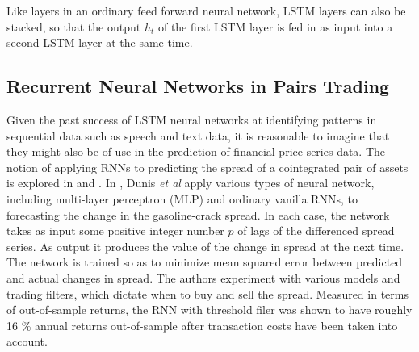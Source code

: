 \documentclass{article}
\begin{document}
Like layers in an ordinary feed forward neural network, LSTM layers can also be stacked, so that the output $h_{t}$ of the first LSTM layer is fed in as input into a second LSTM layer at the same time. 














\subsection{Recurrent Neural Networks in Pairs Trading}

Given the past success of LSTM neural networks at identifying patterns in sequential data such as speech and text data, it is reasonable to imagine that they might also be of use in the prediction of financial price series data. 
The notion of applying RNNs to predicting the spread of a cointegrated pair of assets is explored in \cite{dunis2006modelling} and \cite{van2017pairs}. In \cite{dunis2006modelling}, Dunis \textit{et al} apply various types of neural network, including multi-layer perceptron (MLP) and ordinary vanilla RNNs, to forecasting the change in the gasoline-crack spread. In each case, the network takes as input some positive integer number $p$ of lags of the differenced spread series. As output it produces the value of the change in spread at the next time. The network is trained so as to minimize mean squared error between predicted and actual changes in spread. The authors experiment with various models and trading filters, which dictate when to buy and sell the spread. Measured in terms of out-of-sample returns, the RNN with threshold filer was shown to have roughly 16 \% annual returns out-of-sample after transaction costs have been taken into account. 
 
\end{document}
